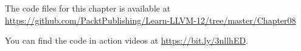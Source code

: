 The code files for this chapter is available at  \url{https://github.com/PacktPublishing/Learn-LLVM-12/tree/master/Chapter08}\par

You can find the code in action videos at \url{https://bit.ly/3nllhED}.\par